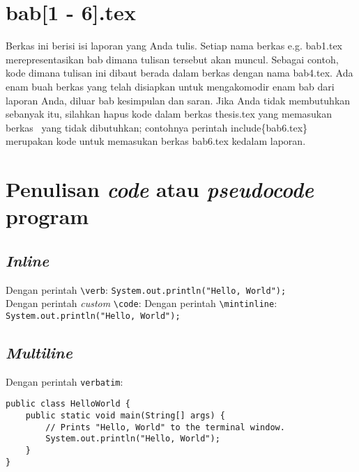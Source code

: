\section{bab[1 - 6].tex}
Berkas ini berisi isi laporan yang Anda tulis. 
Setiap nama berkas e.g. bab1.tex merepresentasikan bab dimana tulisan tersebut 
akan muncul. 
Sebagai contoh, kode dimana tulisan ini dibaut berada dalam berkas dengan nama 
bab4.tex. 
Ada enam buah berkas yang telah disiapkan untuk mengakomodir enam bab dari 
laporan Anda, diluar bab kesimpulan dan saran. 
Jika Anda tidak membutuhkan sebanyak itu, silahkan hapus kode dalam berkas 
thesis.tex yang memasukan berkas \latex~yang tidak dibutuhkan;  contohnya 
perintah \bslash include\{bab6.tex\} merupakan kode untuk memasukan berkas 
bab6.tex kedalam laporan.

\section{Penulisan \textit{code} atau \textit{pseudocode} program}

\subsection{\textit{Inline}}

Dengan perintah \verb|\verb|: \verb|System.out.println("Hello, World");| \\
Dengan perintah \textit{custom} \verb|\code|: 
Dengan perintah \verb|\mintinline|: \texttt{System.out.println("Hello, World"); }

\subsection{\textit{Multiline}}

Dengan perintah \verb|verbatim|: 

\begin{verbatim}	
public class HelloWorld {
    public static void main(String[] args) {
        // Prints "Hello, World" to the terminal window.
        System.out.println("Hello, World");
    }
}
\end{verbatim}


